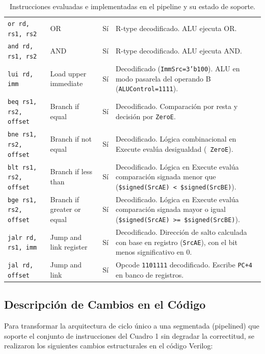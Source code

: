 \documentclass[12pt, a4paper]{article}
\begin{document}
\begin{table}[H]
\begin{tabular}{>{\raggedright\arraybackslash}p{3.3cm} >{\raggedright\arraybackslash}p{3.0cm} c >{\raggedright\arraybackslash}p{6.4cm}}
\texttt{or rd, rs1, rs2} & OR & Sí & R-type decodificado. ALU ejecuta OR. \\
\texttt{and rd, rs1, rs2} & AND & Sí & R-type decodificado. ALU ejecuta AND. \\
\texttt{lui rd, imm} & Load upper immediate & Sí & Decodificado (\texttt{ImmSrc=3'b100}). ALU en modo pasarela del operando B (\texttt{ALUControl=1111}). \\
\texttt{beq rs1, rs2, offset} & Branch if equal & Sí & Decodificado. Comparación por resta y decisión por \texttt{ZeroE}. \\
\texttt{bne rs1, rs2, offset} & Branch if not equal & Sí & Decodificado. Lógica combinacional en Execute evalúa desigualdad (\texttt{~ZeroE}). \\
\texttt{blt rs1, rs2, offset} & Branch if less than & Sí & Decodificado. Lógica en Execute evalúa comparación signada menor que (\texttt{\$signed(SrcAE) < \$signed(SrcBE)}). \\
\texttt{bge rs1, rs2, offset} & Branch if greater or equal & Sí & Decodificado. Lógica en Execute evalúa comparación signada mayor o igual (\texttt{\$signed(SrcAE) >= \$signed(SrcBE)}). \\
\texttt{jalr rd, rs1, imm} & Jump and link register & Sí & Decodificado. Dirección de salto calculada con base en registro (\texttt{SrcAE}), con el bit menos significativo en 0. \\
\texttt{jal rd, offset} & Jump and link & Sí & Opcode \texttt{1101111} decodificado. Escribe \texttt{PC+4} en banco de registros. \\
\bottomrule
\end{tabular}
\caption{Instrucciones evaluadas e implementadas en el pipeline y su estado de soporte.}
\end{table}


\subsection{Descripción de Cambios en el Código}

Para transformar la arquitectura de ciclo único a una segmentada (pipelined) que soporte el conjunto de instrucciones del Cuadro 1 sin degradar la correctitud, se realizaron los siguientes cambios estructurales en el código Verilog:
\end{document}
